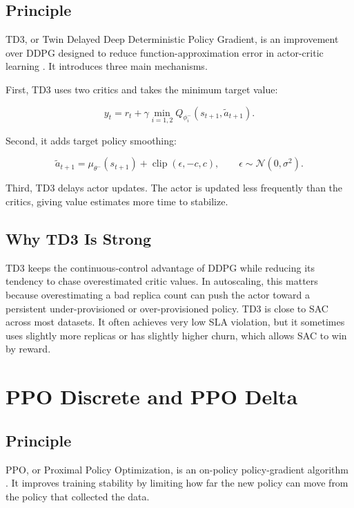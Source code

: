 \documentclass{rapportINPTCLOUD}
\begin{document}
\subsection{Principle}

TD3, or Twin Delayed Deep Deterministic Policy Gradient, is an improvement over DDPG designed to reduce function-approximation error in actor-critic learning \cite{fujimoto2018}. It introduces three main mechanisms.

First, TD3 uses two critics and takes the minimum target value:

\begin{equation}
y_t =
r_t
+ \gamma
\min_{i=1,2}
Q_{\phi_i^-}
\left(
s_{t+1},
\tilde{a}_{t+1}
\right).
\end{equation}

Second, it adds target policy smoothing:

\begin{equation}
\tilde{a}_{t+1}
=
\mu_{\theta^-}(s_{t+1})
+ \operatorname{clip}(\epsilon,-c,c),
\qquad
\epsilon \sim \mathcal{N}(0,\sigma^2).
\end{equation}

Third, TD3 delays actor updates. The actor is updated less frequently than the critics, giving value estimates more time to stabilize.

\subsection{Why TD3 Is Strong}

TD3 keeps the continuous-control advantage of DDPG while reducing its tendency to chase overestimated critic values. In autoscaling, this matters because overestimating a bad replica count can push the actor toward a persistent under-provisioned or over-provisioned policy. TD3 is close to SAC across most datasets. It often achieves very low SLA violation, but it sometimes uses slightly more replicas or has slightly higher churn, which allows SAC to win by reward.

\section{PPO Discrete and PPO Delta}

\subsection{Principle}

PPO, or Proximal Policy Optimization, is an on-policy policy-gradient algorithm \cite{schulman2017}. It improves training stability by limiting how far the new policy can move from the policy that collected the data.
\end{document}
